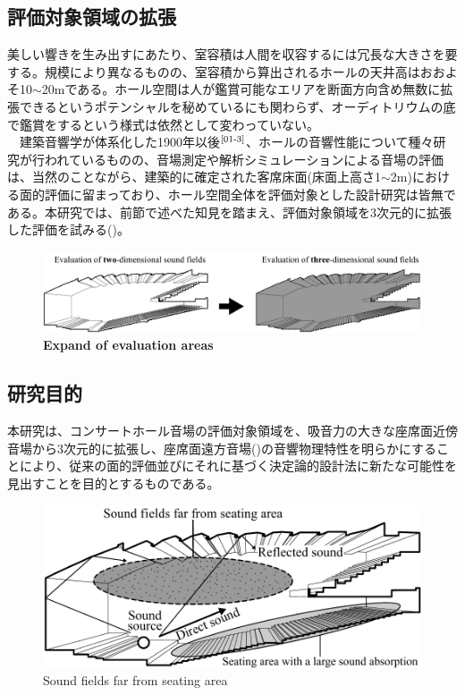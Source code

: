 \newpage
\subsection{評価対象領域の拡張}
美しい響きを生み出すにあたり、室容積は人間を収容するには冗長な大きさを要する。規模により異なるものの、室容積から算出されるホールの天井高はおおよそ10$\sim$20mである。ホール空間は人が鑑賞可能なエリアを断面方向含め無数に拡張できるというポテンシャルを秘めているにも関わらず、オーディトリウムの底で鑑賞をするという様式は依然として変わっていない。
\\　建築音響学が体系化した1900年以後$^{\text{\cite{01-3}}}$、ホールの音響性能について種々研究が行われているものの、音場測定や解析シミュレーションによる音場の評価は、当然のことながら、建築的に確定された客席床面(床面上高さ1$\sim$2m)における面的評価に留まっており、ホール空間全体を評価対象とした設計研究は皆無である。本研究では、前節で述べた知見を踏まえ、評価対象領域を3次元的に拡張した評価を試みる()。
\begin{figure}[h]
    \centering
    \includegraphics[keepaspectratio,scale=0.41]{01_att/evaluate_area.pdf}
    \caption{\hspace{1mm}\textbf{Expand of evaluation areas}}
    \label{fig:評価対象領域の拡張}
\end{figure}

\subsection{研究目的}
本研究は、コンサートホール音場の評価対象領域を、吸音力の大きな座席面近傍音場から3次元的に拡張し、座席面遠方音場()の音響物理特性を明らかにすることにより、従来の面的評価並びにそれに基づく決定論的設計法に新たな可能性を見出すことを目的とするものである。
\begin{figure}[h]
    \centering
    \includegraphics[keepaspectratio,scale=0.8]{01_att/zasekimen_enpo_English.pdf}
    \caption{\hspace{1mm}Sound fields far from seating area}
    \label{fig:座席面遠方音場}
\end{figure}

